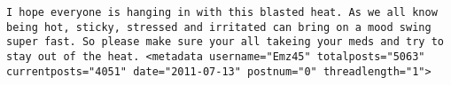 \begin{verbatim}
I hope everyone is hanging in with this blasted heat. As we all know being hot, sticky, stressed and irritated can bring on a mood swing super fast. So please make sure your all takeing your meds and try to stay out of the heat. <metadata username="Emz45" totalposts="5063" currentposts="4051" date="2011-07-13" postnum="0" threadlength="1">
\end{verbatim}